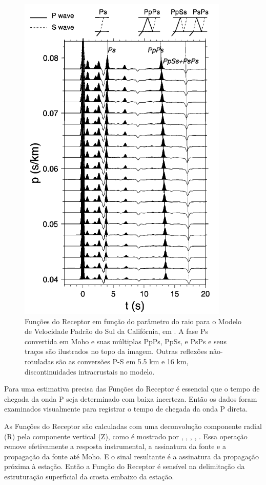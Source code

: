 \begin{figure}[!ht]
\centering
\includegraphics[scale=0.8]{funcoes_sinteticas.png}
\caption{Funções do Receptor em função do parâmetro do raio para o Modelo de Velocidade Padrão do Sul da Califórnia, em \cite{Zhu_Kanamori_2000}. A fase Ps convertida em Moho e suas múltiplas  PpPs, PpSs, e PsPs e seus traços são ilustrados no topo da imagem. Outras reflexões não-rotuladas são as conversões P-S em 5.5 km e 16 km, discontinuidades intracrustais no modelo.}
\label{funcoes_sinteticas}
\end{figure}

Para uma estimativa precisa das Funções do Receptor é essencial que o tempo de chegada da onda P seja determinado com baixa incerteza. Então os dados foram examinados visualmente para registrar o tempo de chegada da onda P direta. 

As Funções do Receptor são calculadas com uma deconvolução componente radial (R) pela componente vertical (Z), como é mostrado por \cite{clayton_source_1976}, \cite{Langston_1977}, \cite{ammon_isolation_1991}, \cite{cassidy_numerical_1992}, \cite{Zhu_Kanamori_2000}. Essa operação remove efetivamente a resposta instrumental, a assinatura da fonte e a propagação da fonte até Moho. E o sinal resultante é a assinatura da propagação próxima à estação. Então a Função do Receptor é sensível na delimitação da estruturação superficial da crosta embaixo da estação.

